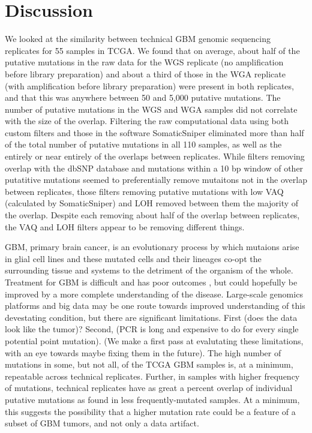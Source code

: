\documentclass[11pt]{article} %
\begin{document}
\section{Discussion}

We looked at the similarity between technical GBM genomic sequencing replicates for 55 samples in TCGA. We found that on average, about half of the putative mutations in the raw data for the WGS replicate (no amplification before library preparation) and about a third of those in the WGA replicate (with amplification before library preparation) were present in both replicates, and that this was anywhere between 50 and 5,000 putative mutations. The number of putative mutations in the WGS and WGA samples did not correlate with the size of the overlap. Filtering the raw computational data using both custom filters and those in the software SomaticSniper eliminated more than half of the total number of putative mutations in all 110 samples, as well as the entirely or near entirely of the overlaps between replicates. While filters removing overlap with the dbSNP database and mutations within a 10 bp window of other putatitive mutations seemed to preferentially remove mutaitons not in the overlap between replicates, those filters removing putative mutations with low VAQ (calculated by SomaticSniper) and LOH removed between them the majority of the overlap. Despite each removing about half of the overlap between replicates, the VAQ and LOH filters appear to be removing different things.

GBM, primary brain cancer, is an evolutionary process by which mutaions arise in glial cell lines and these mutated cells and their lineages co-opt the surrounding tissue and systems to the detriment of the organism of the whole. Treatment for GBM is difficult and has poor outcomes \cite{GBM-treatments}, but could hopefully be improved by a more complete understanding of the disease. Large-scale genomics platforms and big data may be one route towards improved understanding of this devestating condition, but there are significant limitations. First (does the data look like the tumor)? Second, (PCR is long and expensive to do for every single potential point mutation). (We make a first pass at evalutating these limitations, with an eye towards maybe fixing them in the future).   
The high number of mutations in some, but not all, of the TCGA GBM samples is, at a minimum, repeatable across technical replicates. Further, in samples with higher frequency of mutations, technical replicates have as great a percent overlap of individual putative mutations as found in less frequently-mutated samples. At a minimum, this suggests the possibility that a higher mutation rate could be a feature of a subset of GBM tumors, and not only a data artifact.
\end{document}
